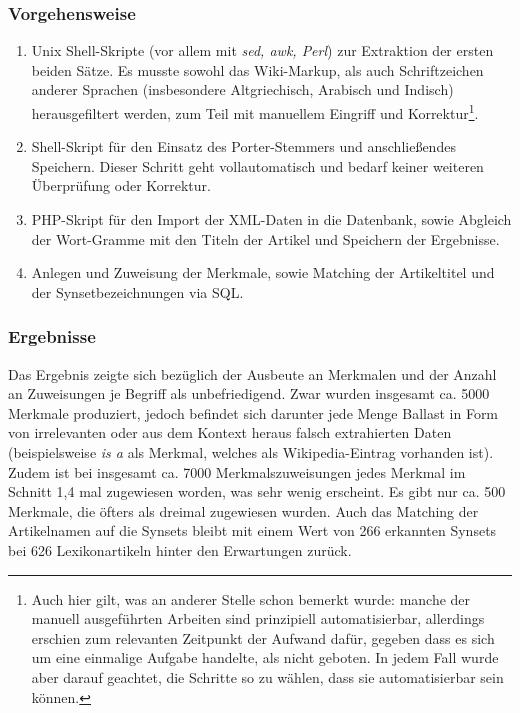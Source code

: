 \documentclass[pagesize,paper=A4,DIV=calc,fontsize=12pt,draft=false]{scrreprt}
\begin{document}
\subsubsection{Vorgehensweise}

\begin{enumerate}
\item Unix Shell-Skripte (vor allem mit \emph{sed, awk, Perl}) zur Extraktion der ersten beiden Sätze. 
Es musste sowohl das Wiki-Markup, als auch Schriftzeichen anderer Sprachen (insbesondere Altgriechisch, Arabisch und Indisch) herausgefiltert werden, zum Teil mit manuellem Eingriff und Korrektur\footnote{Auch hier gilt, was an anderer Stelle schon bemerkt wurde: manche der manuell ausgeführten Arbeiten sind prinzipiell automatisierbar, allerdings erschien zum relevanten Zeitpunkt der Aufwand dafür, gegeben dass es sich um eine einmalige Aufgabe handelte, als nicht geboten. 
In jedem Fall wurde aber darauf geachtet, die Schritte so zu wählen, dass sie automatisierbar sein können.}.
\item Shell-Skript für den Einsatz des Porter-Stemmers und anschließendes Speichern. 
Dieser Schritt geht vollautomatisch und bedarf keiner weiteren Überprüfung oder Korrektur.
\item PHP-Skript für den Import der XML-Daten in die Datenbank, sowie Abgleich der Wort-Gramme mit den Titeln der Artikel und Speichern der Ergebnisse.
\item Anlegen und Zuweisung der Merkmale, sowie Matching der Artikeltitel und der Synsetbezeichnungen via SQL. 
\end{enumerate}

\subsubsection{Ergebnisse}

Das Ergebnis zeigte sich bezüglich der Ausbeute an Merkmalen und der Anzahl an Zuweisungen je Begriff als unbefriedigend. 
Zwar wurden insgesamt ca. 5000 Merkmale produziert, jedoch befindet sich darunter jede Menge Ballast in Form von irrelevanten oder aus dem Kontext heraus falsch extrahierten Daten (beispielsweise \emph{is a} als Merkmal, welches als Wikipedia-Eintrag vorhanden ist). 
Zudem ist bei insgesamt ca. 7000 Merkmalszuweisungen jedes Merkmal im Schnitt 1,4 mal zugewiesen worden, was sehr wenig erscheint. 
Es gibt nur ca. 500 Merkmale, die öfters als dreimal zugewiesen wurden. 
Auch das Matching der Artikelnamen auf die Synsets bleibt mit einem Wert von 266 erkannten Synsets bei 626 Lexikonartikeln hinter den Erwartungen zurück. 
\end{document}
